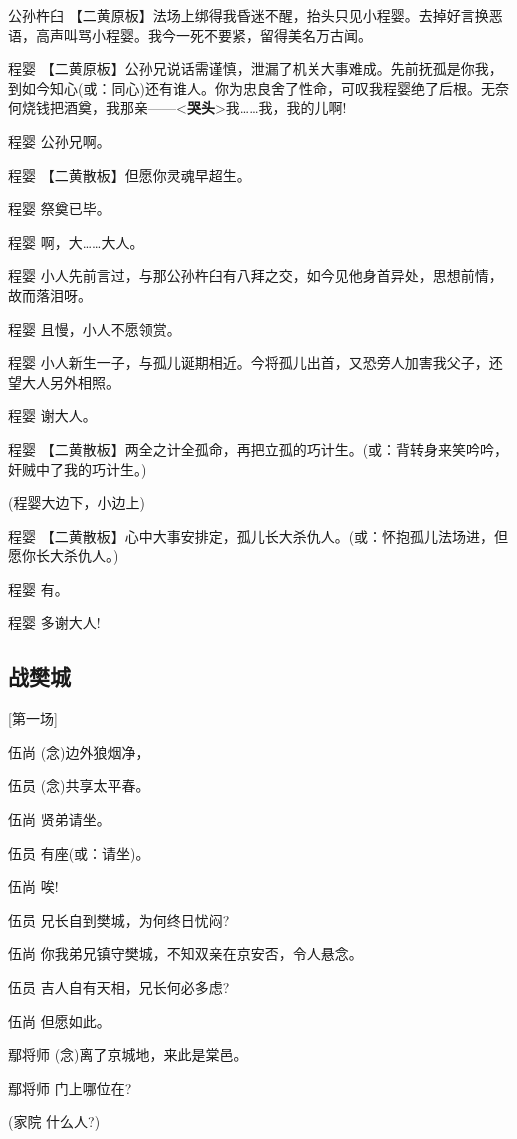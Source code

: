 公孙杵臼
【二黄原板】法场上绑得我昏迷不醒，抬头只见小程婴。去掉好言换恶语，高声叫骂小程婴。我今一死不要紧，留得美名万古闻。

程婴
【二黄原板】公孙兄说话需谨慎，泄漏了机关大事难成。先前抚孤是你我，到如今知心(或：同心)还有谁人。你为忠良舍了性命，可叹我程婴绝了后根。无奈何烧钱把酒奠，我那亲------\textless{}\textbf{哭头}\textgreater{}我\ldots{}\ldots{}我，我的儿啊!

程婴 公孙兄啊。

程婴 【二黄散板】但愿你灵魂早超生。

程婴 祭奠已毕。

程婴 啊，大\ldots{}\ldots{}大人。

程婴
小人先前言过，与那公孙杵臼有八拜之交，如今见他身首异处，思想前情，故而落泪呀。

程婴 且慢，小人不愿领赏。

程婴
小人新生一子，与孤儿诞期相近。今将孤儿出首，又恐旁人加害我父子，还望大人另外相照。

程婴 谢大人。

程婴
【二黄散板】两全之计全孤命，再把立孤的巧计生。(或：背转身来笑吟吟，奸贼中了我的巧计生。)

(程婴大边下，小边上)

程婴
【二黄散板】心中大事安排定，孤儿长大杀仇人。(或：怀抱孤儿法场进，但愿你长大杀仇人。)

程婴 有。

程婴 多谢大人!

\hypertarget{ux6218ux6a0aux57ce}{%
\subsection{战樊城}\label{ux6218ux6a0aux57ce}}

{[}第一场{]}

伍尚 (念)边外狼烟净，

伍员 (念)共享太平春。

伍尚 贤弟请坐。

伍员 有座(或：请坐)。

伍尚 唉!

伍员 兄长自到樊城，为何终日忧闷?

伍尚 你我弟兄镇守樊城，不知双亲在京安否，令人悬念。

伍员 吉人自有天相，兄长何必多虑?

伍尚 但愿如此。

鄢将师 (念)离了京城地，来此是棠邑。

鄢将师 门上哪位在?

(家院 什么人?)

